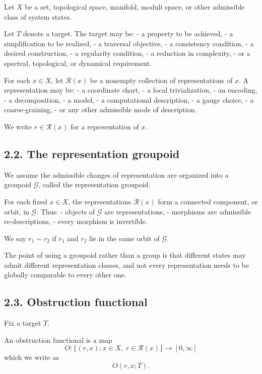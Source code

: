 \documentclass[
]{article}
\begin{document}
Let \(X\) be a set, topological space, manifold, moduli space, or other
admissible class of system states.

Let \(T\) denote a target. The target may be: - a property to be
achieved, - a simplification to be realized, - a traversal objective, -
a consistency condition, - a desired construction, - a regularity
condition, - a reduction in complexity, - or a spectral, topological, or
dynamical requirement.

For each \(x \in X\), let \(\mathcal{R}(x)\) be a nonempty collection of
representations of \(x\). A representation may be: - a coordinate chart,
- a local trivialization, - an encoding, - a decomposition, - a model, -
a computational description, - a gauge choice, - a coarse-graining, - or
any other admissible mode of description.

We write \(r \in \mathcal{R}(x)\) for a representation of \(x\).

\subsection{2.2. The representation
groupoid}\label{the-representation-groupoid}

We assume the admissible changes of representation are organized into a
groupoid \(\mathcal{G}\), called the representation groupoid.

For each fixed \(x \in X\), the representations \(\mathcal{R}(x)\) form
a connected component, or orbit, in \(\mathcal{G}\). Thus: - objects of
\(\mathcal{G}\) are representations, - morphisms are admissible
re-descriptions, - every morphism is invertible.

We say \(r_1 \sim r_2\) if \(r_1\) and \(r_2\) lie in the same orbit of
\(\mathcal{G}\).

The point of using a groupoid rather than a group is that different
states may admit different representation classes, and not every
representation needs to be globally comparable to every other one.

\subsection{2.3. Obstruction functional}\label{obstruction-functional}

Fix a target \(T\).

An obstruction functional is a map \[
O: \{(r,x) : x \in X,\ r \in \mathcal{R}(x)\} \to [0,\infty]
\] which we write as \[
O(r,x;T).
\]
\end{document}
